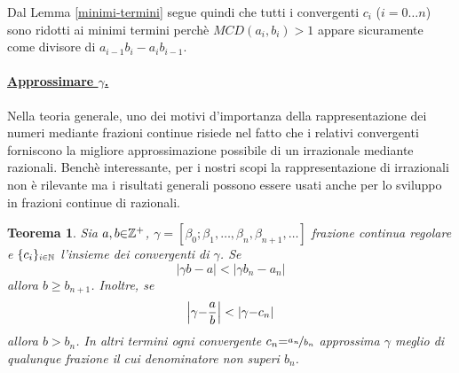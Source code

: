 \documentclass[twoside,symmetric,justified,openany,nobib]{tufte-book}
\def\SP#1{\textsuperscript{#1}}
\newtheorem{thm}{Teorema}
\begin{document}
\noindent
Dal Lemma \ref{minimi-termini} segue quindi che tutti i convergenti $c_i$ ($i{=}0{\dots}n$) sono ridotti ai minimi termini perchè $MCD(a_i,b_i){>}1$ appare sicuramente come divisore di $a_{i-1}b_i{-}a_ib_{i-1}$.

\paragraph{\normalfont\textbf{\underline{Approssimare $\gamma$.}}}Nella teoria generale, uno dei motivi d'importanza della rappresentazione dei numeri mediante frazioni continue risiede nel fatto che i relativi convergenti forniscono la migliore approssimazione possibile di un irrazionale mediante razionali. Benchè interessante, per i nostri scopi la rappresentazione di irrazionali non è rilevante ma i risultati generali possono essere usati anche per lo sviluppo in frazioni continue di razionali.
\begin{thm}
  \label{legendre1}
  Sia $a,b{\in}\mathbb{Z}\SP{+}$, $\gamma{=}[\beta_0;\beta_1,\dots,\beta_n,\beta_{n+1},\dots]$ frazione continua regolare\sidenote[2][]{} e $\{ c_i \}_{\scalebox{.7}{$i{\in}\mathbb{N}$}}$ l'insieme dei convergenti di $\gamma$. Se
  \begin{equation}
    \label{legendre1-1}
    |\gamma b{-}a| < |\gamma b_n{-}a_n|
  \end{equation}
  allora $b{\geq}b_{n+1}$. Inoltre, se
  \begin{equation}
    \label{legendre1-2}
    \Bigl|\gamma {-}\frac{a}{b}\Bigr| < |\gamma {-}c_n|
  \end{equation}
  allora $b{>}b_n$. In altri termini ogni convergente $c_n{=}\nicefrac{a_n}{b_n}$ approssima $\gamma$ meglio di qualunque frazione il cui denominatore non superi $b_n$.
\end{thm}
\end{document}
